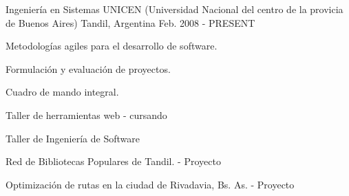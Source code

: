 


\begin{cventries}


\cventry
{Ingeniería en Sistemas} %
{UNICEN (Universidad Nacional del centro de la provicia de Buenos Aires)} %
{Tandil, Argentina} %
{Feb. 2008 - PRESENT} %
{ %
\begin{cvitems}
\item {Metodologías agiles para el desarrollo de software.}
\item {Formulación y evaluación de proyectos.}
\item {Cuadro de mando integral.}
\item {Taller de herramientas web - cursando}
\item {Taller de Ingeniería de Software}
\item {Red de Bibliotecas Populares de Tandil. - Proyecto}
\item {Optimización de rutas en la ciudad de Rivadavia, Bs. As. - Proyecto}
\end{cvitems}
}


\end{cventries}
